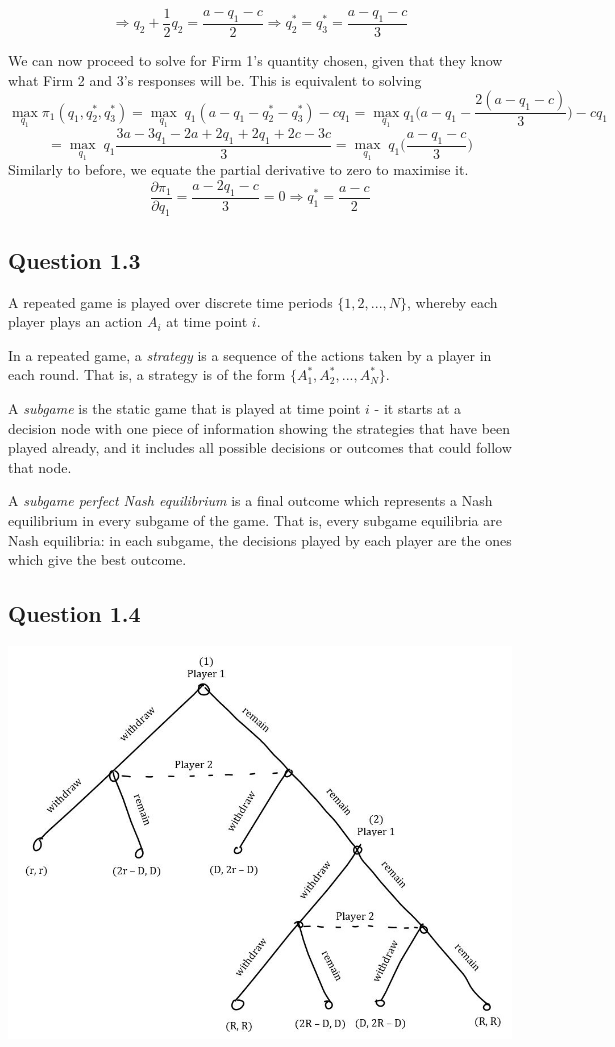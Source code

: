 \documentclass[11pt,a4paper]{article}
\begin{document}
$$ \Rightarrow q_2 + \frac{1}{2}q_2 = \frac{a-q_1-c}{2} \Rightarrow q_2^* = q_3^* = \frac{a-q_1-c}{3}$$

We can now proceed to solve for Firm 1's quantity chosen, given that they know what Firm 2 and 3's responses will be. This is equivalent to solving 
$$\max_{q_1}\pi_1(q_1,q_2^*,q_3^*) = \max_{q_1} \; q_1(a-q_1-q_2^* - q_3^*) - cq_1 = \max_{q_1} q_1\Big(a-q_1-\frac{2(a-q_1-c)}{3}\Big) - cq_1 $$
$$ = \max_{q_1}\; q_1\frac{3a-3q_1-2a+2q_1+2q_1+2c-3c}{3} = \max_{q_1}\; q_1 \Big(\frac{a-q_1-c}{3}\Big)$$
Similarly to before, we equate the partial derivative to zero to maximise it.
$$ \frac{\partial \pi_1}{\partial q_1} = \frac{a-2q_1-c}{3} = 0 \Rightarrow q_1^* = \frac{a-c}{2}$$

\subsection*{Question 1.3}

A repeated game is played over discrete time periods  $\{1, 2, ..., N\}$, whereby each player plays an action $A_i$ at time point $i$.

In a repeated game, a \textit{strategy} is a sequence of the actions taken by a player in each round. That is, a strategy is of the form $\{A_1^*, A_2^*, ..., A_N^*\}$.

A \textit{subgame} is the static game that is played at time point $i$ - it starts at a decision node with one piece of information showing the strategies that have been played already, and it includes all possible decisions or outcomes that could follow that node.

A \textit{subgame perfect Nash equilibrium} is a final outcome which represents a Nash equilibrium in every subgame of the game. That is, every subgame equilibria are Nash equilibria: in each subgame, the decisions played by each player are the ones which give the best outcome.

\subsection*{Question 1.4}

\includegraphics[width=\textwidth]{Fig.JPG} 
\end{document}
